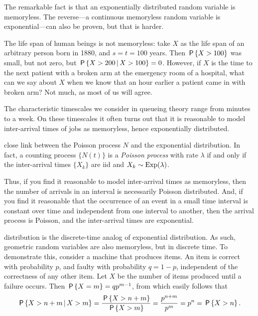 The remarkable fact is that an exponentially distributed random variable is memoryless.
The reverse---a continuous memoryless random variable is exponential---can also be proven, but that is harder.

The life span of human beings is not memoryless: take $X$ as the life span of an arbitrary person born in 1880, and $s=t = 100$ years.
Then $\P{X>100}$ was small, but not zero, but $\P{X>200 \given X>100} = 0$.
However, if $X$ is the time to the next patient with a broken arm at the emergency room of a hospital, what can we say about $X$ when we know that an hour earlier a patient came in with broken arm?
Not much, as most of us will agree.

The characteristic timescales we consider in queueing theory range from minutes to a week.
On these timescales it often turns out that it is reasonable to model inter-arrival times of jobs as memoryless, hence exponentially distributed.


 close link between the Poisson process $N$ and the exponential distribution.
In fact, a counting process $\{N(t)\}$ is a \emph{Poisson process} with rate $\lambda$ if and only if the inter-arrival times $\{X_k\}$ are iid and $X_{k} \sim \Exp(\lambda)$.


Thus, if you find it reasonable to model inter-arrival times as memoryless, then the number of arrivals in an interval is necessarily Poisson distributed.
And, if you find it reasonable that the occurrence of an event in a small time interval is constant over time and independent from one interval to another, then the arrival process is Poisson, and the inter-arrival times are exponential.


 distribution is the discrete-time analog of exponential distribution.
As such, geometric random variables are also memoryless, but in discrete time.
To demonstrate this, consider a machine that produces items.
An item is correct with probability $p$, and faulty with probability $q=1-p$, independent of the correctness of any other item.
Let $X$ be the number of items produced until a failure occurs.  Then $\P{X=m} = q p^{m-1}$, from which easily follows that
\begin{equation}  \label{eq:81}
\P{X>n+m\given X>m} = \frac{\P{X>n+m}}{\P{X>m}} = \frac{p^{n+m}}{p^m}=p^{n} = \P{X>n}.
\end{equation}



